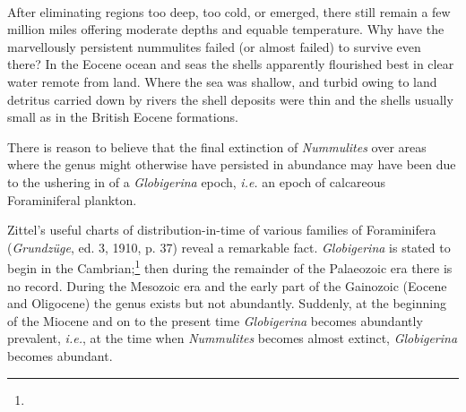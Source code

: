 \documentclass[a4paper, 12pt, oneside]{article}
\begin{document}
\paragraph{}
After eliminating regions too deep, too cold, or emerged, there still remain a few million miles offering moderate depths and equable temperature. Why have the marvellously persistent nummulites failed (or almost failed) to survive even there? In the Eocene ocean and seas the shells apparently flourished best in clear water remote from land. Where the sea was shallow, and turbid owing to land detritus carried down by rivers the shell deposits were thin and the shells usually small as in the British Eocene formations.

There is reason to believe that the final extinction of \emph{Nummulites} over areas where the genus might otherwise have persisted in abundance may have been due to the ushering in of a \emph{Globigerina} epoch, \emph{i.e.} an epoch of calcareous Foraminiferal plankton.

Zittel's useful charts of distribution-in-time of various families of Foraminifera (\emph{Grundzüge}, ed. 3, 1910, p. 37) reveal a remarkable fact. \emph{Globigerina} is stated to begin in the Cambrian;\footnote{} then during the remainder of the Palaeozoic era there is no record. During the Mesozoic era and the early part of the Gainozoic (Eocene and Oligocene) the genus exists but not abundantly. Suddenly, at the beginning of the Miocene and on to the present time \emph{Globigerina} becomes abundantly prevalent, \emph{i.e.}, at the time when \emph{Nummulites} becomes almost extinct, \emph{Globigerina} becomes abundant.
\end{document}
